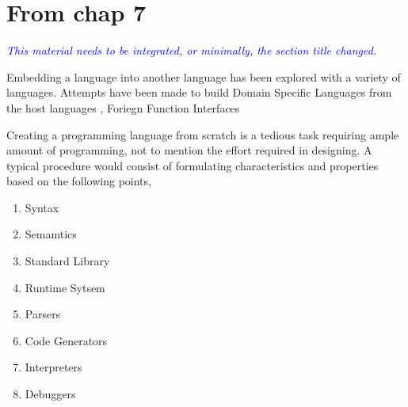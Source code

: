 \documentclass[thesis-solanki.tex]{subfiles}
\begin{document}
\begin{comment}
\begin{description}
\item[$\bullet$]Concatenative Programming Libraries
\begin{enumerate}
	\item peg \cite{peg-lib}
\end{enumerate}

\item[$\bullet$]Constraint Programming and Constraint Handling Rules
\begin{enumerate}
	\item monadiccp \cite{monadiccp-lib}
	\item monadicccp-gecode \cite{monadiccp-gecode-lib}
	\item csp \cite{csp-lib}
	\item liquid fix point \cite{liquid-fix-point-lib}
\end{enumerate}
\end{description}
\end{comment}


\section{\textbf{From chap 7}}

\textcolor{blue}{\itshape This material needs to be integrated, or minimally, the section title changed.}

Embedding a language into another language has been explored with a variety of languages.
Attempts have been made to build Domain Specific Languages from the host languages \cite{hudak1996building},
Foriegn Function Interfaces \cite{barzilay2004foreign}

Creating a programming language from scratch is a tedious task requiring ample
amount of programming, not to
mention the effort required in designing.
A typical procedure would consist of formulating characteristics and properties based on the following points,

\begin{enumerate}
\item Syntax
\item Semamtics
\item Standard Library
\item Runtime Sytsem
\item Parsers
\item Code Generators
\item Interpreters
\item Debuggers
\end{enumerate}
\end{document}
